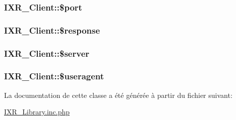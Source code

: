 \hypertarget{classIXR__Client_o1}{
\subsubsection[\$port]{\setlength{\rightskip}{0pt plus 5cm}IXR\_\-Client::\$port}}
\label{classIXR__Client_o1}


\hypertarget{classIXR__Client_o4}{
\subsubsection[\$response]{\setlength{\rightskip}{0pt plus 5cm}IXR\_\-Client::\$response}}
\label{classIXR__Client_o4}


\hypertarget{classIXR__Client_o0}{
\subsubsection[\$server]{\setlength{\rightskip}{0pt plus 5cm}IXR\_\-Client::\$server}}
\label{classIXR__Client_o0}


\hypertarget{classIXR__Client_o3}{
\subsubsection[\$useragent]{\setlength{\rightskip}{0pt plus 5cm}IXR\_\-Client::\$useragent}}
\label{classIXR__Client_o3}




La documentation de cette classe a \'{e}t\'{e} g\'{e}n\'{e}r\'{e}e \`{a} partir du fichier suivant:\begin{CompactItemize}
\item 
\hyperlink{IXR__Library_8inc_8php}{IXR\_\-Library.inc.php}\end{CompactItemize}
